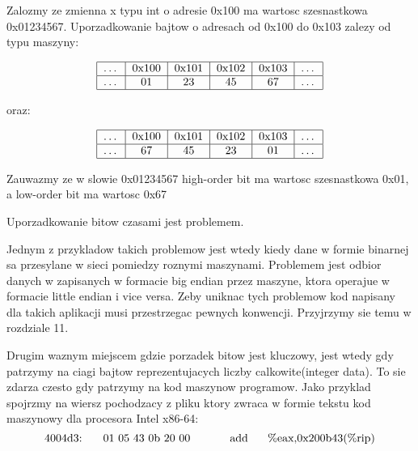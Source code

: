 \documentclass{article}
\begin{document}
Zalozmy ze zmienna x typu int o adresie 0x100 ma wartosc szesnastkowa 0x01234567. Uporzadkowanie bajtow o adresach od 0x100 do 0x103 zalezy od typu maszyny:

\begin{tcolorbox}[colback=white!90!blue,colframe=white!35!blue,title=Big endian:]
$$    
\begin{tabular}{|c|c|c|c|c|c|}
\hline
  \dots  & 0x100 & 0x101 & 0x102 & 0x103 & \dots \\
\hline
    \dots & 01 & 23 & 45 & 67 & \dots \\
\hline    
\end{tabular}
$$    
\end{tcolorbox}

oraz:

\begin{tcolorbox}[colback=white!90!blue,colframe=white!35!blue,title=Little endian:]
$$    
\begin{tabular}{|c|c|c|c|c|c|}
\hline
  \dots  & 0x100 & 0x101 & 0x102 & 0x103 & \dots \\
\hline
    \dots & 67 & 45 & 23 & 01 & \dots \\
\hline    
\end{tabular}
$$    
\end{tcolorbox}

Zauwazmy ze w slowie 0x01234567 high-order bit ma wartosc szesnastkowa 0x01, a low-order bit ma wartosc 0x67

Uporzadkowanie bitow czasami jest problemem. 

Jednym z przykladow takich problemow jest wtedy kiedy dane w formie binarnej sa przesylane w sieci pomiedzy roznymi maszynami. Problemem jest odbior danych w zapisanych w formacie big endian przez maszyne, ktora operajue w formacie little endian i vice versa. Zeby uniknac tych problemow kod napisany dla takich aplikacji musi przestrzegac pewnych konwencji. Przyjrzymy sie temu w rozdziale 11. 

Drugim waznym miejscem gdzie porzadek bitow jest kluczowy, jest wtedy gdy patrzymy na ciagi bajtow reprezentujacych liczby calkowite(integer data). To sie zdarza czesto gdy patrzymy na kod maszynow programow. Jako przyklad spojrzmy na wiersz pochodzacy z pliku ktory zwraca w formie tekstu kod maszynowy dla procesora Intel x86-64:
$$\text{4004d3: \hspace{5mm}01 05 43 0b 20 00 \hspace{10mm}      add\hspace{5mm} \%eax,0x200b43(\%rip)}$$
\end{document}
